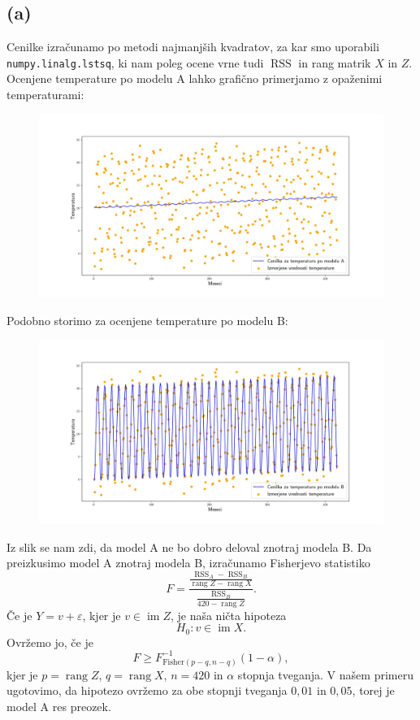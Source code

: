 \documentclass{article}
\DeclareMathOperator*{\rang}{rang}
\DeclareMathOperator*{\ima}{im}
\DeclareMathOperator*{\rss}{RSS}
\begin{document}
\subsection*{(a)}
Cenilke izračunamo po metodi najmanjših kvadratov, za kar smo uporabili \texttt{numpy.linalg.lstsq}, ki nam poleg ocene vrne tudi $\rss$ in rang matrik $X$ in $Z$. Ocenjene temperature po modelu A lahko grafično primerjamo z opaženimi temperaturami:
\begin{figure}[H]
    \centering
    \includegraphics[scale=0.4]{../rezultati/temperature_model_A.jpg}
\end{figure}
Podobno storimo za ocenjene temperature po modelu B:
\begin{figure}[H]
    \centering
    \includegraphics[scale=0.4]{../rezultati/temperature_model_B.jpg}
\end{figure}
Iz slik se nam zdi, da model A ne bo dobro deloval znotraj modela B. Da preizkusimo model A znotraj modela B, izračunamo Fisherjevo statistiko
\begin{equation*}
    F = \frac{\frac{\rss_A - \rss_B}{\rang Z - \rang X}}{\frac{\rss_B}{420 - \rang Z}}.
\end{equation*}
Če je $Y = v + \varepsilon$, kjer je $v \in \ima Z$, je naša ničta hipoteza
\begin{equation*}
    H_0 : v \in \ima X.
\end{equation*}
Ovržemo jo, če je
\begin{equation*}
    F \geq F^{-1}_{\text{Fisher}(p-q, n-q)}(1 - \alpha),
\end{equation*}
kjer je $p = \rang Z$, $q = \rang X$, $n = 420$ in $\alpha$ stopnja tveganja. V našem primeru ugotovimo, da hipotezo ovržemo za obe stopnji tveganja $0{,}01$ in $0{,}05$, torej je model A res preozek. 
\end{document}
